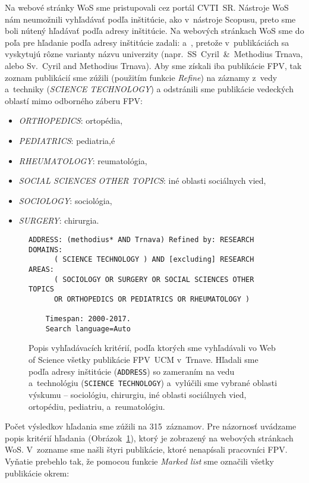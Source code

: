 Na webové stránky WoS sme pristupovali cez portál CVTI~SR.  Nástroje WoS nám
neumožnili vyhľadávať podľa inštitúcie, ako v~nástroje Scopusu, preto sme boli
nútený hľadávať podľa adresy inštitúcie.  Na webových stránkach WoS sme do poľa
pre hľadanie podľa adresy inštitúcie zadali:  a~,
pretože v~publikáciách sa vyskytujú rôzne varianty názvu univerzity
(napr.~SS~Cyril~\&~Methodius Trnava, alebo Sv.~Cyril and Methodius Trnava).
Aby sme získali iba publikácie FPV, tak zoznam publikácií sme zúžili (použitím
funkcie \emph{Refine}) na záznamy z~vedy a~techniky (\emph{SCIENCE TECHNOLOGY})
a odstránili sme publikácie vedeckých oblastí mimo odborného záberu FPV:

\begin{itemize}
\item \emph{ORTHOPEDICS}: ortopédia,
\item \emph{PEDIATRICS}: pediatria,é
\item \emph{RHEUMATOLOGY}: reumatológia,
\item \emph{SOCIAL SCIENCES OTHER TOPICS}: iné oblasti sociálnych vied,
\item \emph{SOCIOLOGY}: sociológia,
\item \emph{SURGERY}: chirurgia.
\end{itemize}

\begin{figure}
  \footnotesize
  \begin{Verbatim}[frame=single]
    ADDRESS: (methodius* AND Trnava) Refined by: RESEARCH DOMAINS:
      ( SCIENCE TECHNOLOGY ) AND [excluding] RESEARCH AREAS:
      ( SOCIOLOGY OR SURGERY OR SOCIAL SCIENCES OTHER TOPICS
      OR ORTHOPEDICS OR PEDIATRICS OR RHEUMATOLOGY )

    Timespan: 2000-2017.
    Search language=Auto
  \end{Verbatim}
  \vspace*{-4mm}
  \caption[Popis kritérií vyhľadávania vo WoS pre FPV]%
  {Popis vyhľadávacích kritérií, podľa ktorých sme vyhľadávali vo Web of Science
    všetky publikácie FPV~UCM v~Trnave.  Hľadali sme podľa adresy inštitúcie
    (\texttt{ADDRESS}) so zameraním na vedu a~technológiu (\texttt{SCIENCE
      TECHNOLOGY}) a~vylúčili sme vybrané oblasti výskumu -- sociológiu,
    chirurgiu, iné oblasti sociálnych vied, ortopédiu, pediatriu,
    a~reumatológiu.}
  \label{fig:wos.query}
\end{figure}


Počet výsledkov hľadania sme zúžili na 315~záznamov.  Pre názornosť uvádzame
popis kritérií hľadania (Obrázok~\ref{fig:wos.query}), ktorý je zobrazený na
webových stránkach WoS.  V~zozname sme našli štyri publikácie, ktoré nenapísali
pracovníci FPV.  Vyňatie prebehlo tak, že pomocou funkcie \emph{Marked list} sme
označili všetky publikácie okrem:

